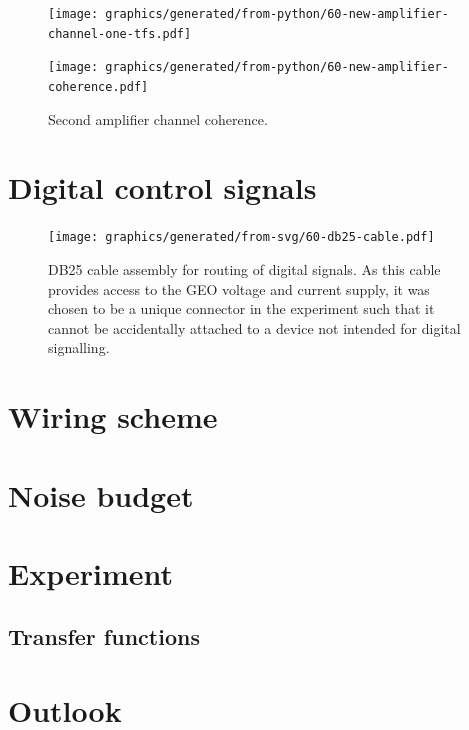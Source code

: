 \begin{figure}
  \centering
  \texttt{[image: graphics/generated/from-python/60-new-amplifier-channel-one-tfs.pdf]}
  \caption[]{}
  \label{fig:new-amplifier-dewhitened-tfs}
\end{figure}

\begin{figure}
  \centering
  \texttt{[image: graphics/generated/from-python/60-new-amplifier-coherence.pdf]}
  \caption[High voltage amplifier cross-channel coherence]{Second amplifier channel coherence.}
  \label{fig:new-amplifier-coherence}
\end{figure}

\section{Digital control signals}

\begin{figure}
  \centering
  \texttt{[image: graphics/generated/from-svg/60-db25-cable.pdf]}
  \caption[DB25 cable assembly]{DB25 cable assembly for routing of digital signals. As this cable provides access to the GEO voltage and current supply, it was chosen to be a unique connector in the experiment such that it cannot be accidentally attached to a device not intended for digital signalling.}
  \label{fig:db25-cable}
\end{figure}

\section{Wiring scheme}

\section{Noise budget}

\section{Experiment}

\subsection{Transfer functions}

\section{Outlook}